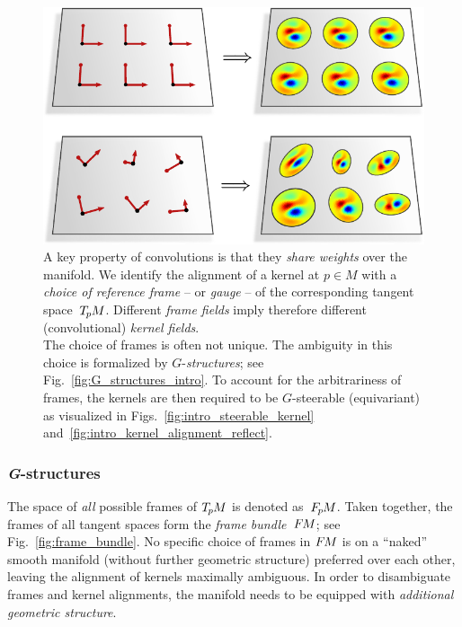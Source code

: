 \begin{figure}
    \centering
    \includegraphics[width=.62\textwidth]{figures/intro_kernel_alignment_trivial.pdf}
    \captionsetup{width=.9\textwidth}
    \caption{\small
        A key property of convolutions is that they \emph{share weights} over the manifold.
        We identify the alignment of a kernel at $p\in M$ with a \emph{choice of reference frame} -- or \emph{gauge} -- of the corresponding tangent space~$T_{\mkern-1.5mu p}\mkern-.5muM$.
        Different \emph{frame fields} imply therefore different (convolutional) \emph{kernel fields}.
        \\[1ex]
        The choice of frames is often not unique.
        The ambiguity in this choice is formalized by $G$-\emph{structures}; see Fig.~\ref{fig:G_structures_intro}.
        To account for the arbitrariness of frames, the kernels are then required to be $G$-steerable (equivariant) as visualized in Figs.~\ref{fig:intro_steerable_kernel} and~\ref{fig:intro_kernel_alignment_reflect}.
        \\[0pt]
        }
    \label{fig:intro_kernel_alignment_trivial}
\end{figure}





\subsubsection{\textit{G}-structures}
\label{sec:visual_intro_GM_subsub}

The space of \emph{all} possible frames of $T_{\mkern-1.5mu p}\mkern-.5muM$ is denoted as~$F_{\mkern-1.5mu p}\mkern-1.0muM$.
Taken together, the frames of all tangent spaces form the \emph{frame bundle}~$F\mkern-1.5muM$; see Fig.~\ref{fig:frame_bundle}.
No specific choice of frames in $F\mkern-1.5muM$ is on a ``naked'' smooth manifold (without further geometric structure) preferred over each other, leaving the alignment of kernels maximally ambiguous.
In order to disambiguate frames and kernel alignments, the manifold needs to be equipped with \emph{additional geometric structure}.


